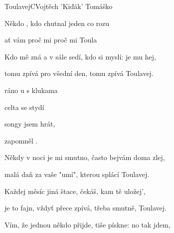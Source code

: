 \setcounter{page}{91}
\begin{song}{Toulavej}{C}{Vojtěch 'Kiďák' Tomáško}

\begin{SBVerse}

Někdo , kdo chutnal  jeden  co rozu

ať vám  proč mi  proč mi  Toula

\end{SBVerse}

\begin{SBVerse}

Kdo mě zná a v sále sedí, kdo si myslí: je mu hej,

tomu zpívá pro všední den, tomu zpívá Toulavej.

\end{SBVerse}

\begin{SBChorus}

 ráno  u  s klukama 

 celta se  stydí

 songy jsem  hrát,

zapomněl .

\end{SBChorus}

\begin{SBVerse}

Někdy v noci je mi smutno, často bejvám doma zlej,

malá daň za vaše "umí", kterou splácí Toulavej.

\end{SBVerse}

\begin{SBVerse}

Každej měsíc jiná štace, čekáš, kam tě uložej',

je to fajn, vždyť přece zpívá, třeba smutně, Toulavej.

\end{SBVerse}

\begin{SBChorus}

\end{SBChorus}

\begin{SBVerse}

Vím, že jednou někdo přijde, tiše pískne: no tak jdem,


\end{SBVerse}
\end{song}

